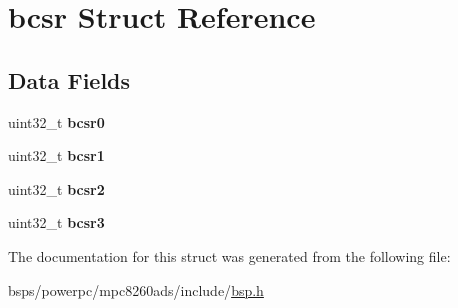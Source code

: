 \hypertarget{structbcsr}{}\section{bcsr Struct Reference}
\label{structbcsr}
\subsection*{Data Fields}
\begin{DoxyCompactItemize}
\item 
\mbox{\label{structbcsr_a569613e634446b493fa21bd040372481}} 
uint32\+\_\+t {\bfseries bcsr0}
\item 
\mbox{\label{structbcsr_a2f84827474431fc61399a210c3ed5fc5}} 
uint32\+\_\+t {\bfseries bcsr1}
\item 
\mbox{\label{structbcsr_a1c7fc4ee07acb788b0df8e5217da9c1a}} 
uint32\+\_\+t {\bfseries bcsr2}
\item 
\mbox{\label{structbcsr_ab5f11c7bce9670b7572a852c502c5991}} 
uint32\+\_\+t {\bfseries bcsr3}
\end{DoxyCompactItemize}


The documentation for this struct was generated from the following file\+:\begin{DoxyCompactItemize}
\item 
bsps/powerpc/mpc8260ads/include/\mbox{\hyperlink{bsps_2powerpc_2mpc8260ads_2include_2bsp_8h}{bsp.\+h}}\end{DoxyCompactItemize}
